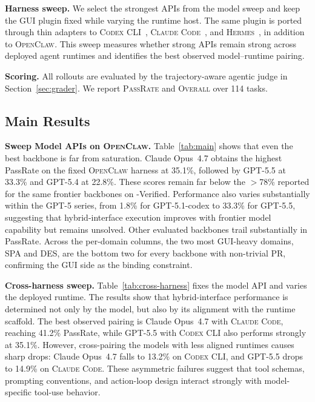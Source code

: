\smallskip
\noindent\textbf{Harness sweep.}
We select the strongest APIs from the model sweep and keep the GUI plugin fixed while varying the runtime host. The same plugin is ported through thin adapters to \textsc{Codex CLI}~\citep{openai2026codexagent}, \textsc{Claude Code}~\citep{anthropic2025claudecode}, and \textsc{Hermes}~\citep{hermes2025}, in addition to \textsc{OpenClaw}. This sweep measures whether strong APIs remain strong across deployed agent runtimes and identifies the best observed model--runtime pairing.

\smallskip
\noindent\textbf{Scoring.}
All rollouts are evaluated by the trajectory-aware agentic judge in Section~\ref{sec:grader}. We report \textsc{PassRate} and \textsc{Overall} over 114 tasks.

\subsection{Main Results}
\label{sec:main-results}

\noindent\textbf{Sweep Model APIs on \textsc{OpenClaw}.}
Table~\ref{tab:main} shows that even the best backbone is far from saturation. Claude Opus~4.7 obtains the highest PassRate on the fixed \textsc{OpenClaw} harness at 35.1\%, followed by GPT-5.5 at 33.3\% and GPT-5.4 at 22.8\%. These scores remain far below the $>$78\% reported for the same frontier backbones on \osworld{}-Verified. Performance also varies substantially within the GPT-5 series, from 1.8\% for GPT-5.1-codex to 33.3\% for GPT-5.5, suggesting that hybrid-interface execution improves with frontier model capability but remains unsolved. Other evaluated backbones trail substantially in PassRate. Across the per-domain columns, the two most GUI-heavy domains, SPA and DES, are the bottom two for every backbone with non-trivial PR, confirming the GUI side as the binding constraint.

\smallskip
\noindent\textbf{Cross-harness sweep.}
Table~\ref{tab:cross-harness} fixes the model API and varies the deployed runtime. The results show that hybrid-interface performance is determined not only by the model, but also by its alignment with the runtime scaffold. The best observed pairing is Claude Opus~4.7 with \textsc{Claude Code}, reaching 41.2\% PassRate, while GPT-5.5 with \textsc{Codex CLI} also performs strongly at 35.1\%. However, cross-pairing the models with less aligned runtimes causes sharp drops: Claude Opus~4.7 falls to 13.2\% on \textsc{Codex CLI}, and GPT-5.5 drops to 14.9\% on \textsc{Claude Code}. These asymmetric failures suggest that tool schemas, prompting conventions, and action-loop design interact strongly with model-specific tool-use behavior.

